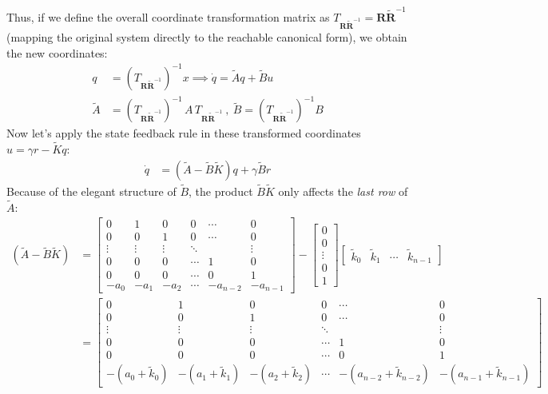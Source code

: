 \documentclass[twoside, 11pt, a4paper]{article}
\begin{document}
Thus, if we define the overall coordinate transformation matrix as $T_{\mathbf{R} \tilde{\mathbf{R}}^{-1}} = \mathbf{R} \tilde{\mathbf{R}}^{-1}$ (mapping the original system directly to the reachable canonical form), we obtain the new coordinates:
%
\begin{align*}
	q &= \left( T_{\mathbf{R} \tilde{\mathbf{R}}^{-1}} \right)^{-1} x \implies \dot{q} = \tilde{A} q + \tilde{B} u \\
	\tilde{A} &= \left( T_{\mathbf{R} \tilde{\mathbf{R}}^{-1}} \right)^{-1} \, A \, T_{\mathbf{R} \tilde{\mathbf{R}}^{-1}} \ , \ \tilde{B} = \left(  T_{\mathbf{R} \tilde{\mathbf{R}}^{-1}} \right)^{-1} B 
\end{align*}
%
Now let's apply the state feedback rule in these transformed coordinates $u = \gamma r - \tilde{K} q$:
%
\begin{align*}
 \dot{q} &= ( \tilde{A} - \tilde{B} \tilde{K} ) q + \gamma \tilde{B} r 
\end{align*}
Because of the elegant structure of $\tilde{B}$, the product $\tilde{B} \tilde{K}$ only affects the \textit{last row} of $\tilde{A}$:
\begin{align*}
 ( \tilde{A} - \tilde{B} \tilde{K} ) &= 
 \left[ \begin{array}{c|c|c|c|c|c} 
0 & 1 & 0 & 0 & \cdots & 0 \\
0 & 0 & 1 &  0 & \cdots & 0 \\
\vdots & \vdots & \vdots & \ddots &  & \vdots \\
0 & 0 & 0 & \cdots  & 1 & 0 \\
0 & 0 & 0 & \cdots  & 0 & 1 \\
-a_{0} & -a_{1} & -a_{2} & \cdots  & -a_{n-2} & -a_{n-1} 
\end{array} \right] - \begin{bmatrix} 0 \\ 0 \\ \vdots \\ 0 \\ 1 \end{bmatrix}
\begin{bmatrix} \tilde{k}_0 & \tilde{k}_1 & \cdots & \tilde{k}_{n-1} \end{bmatrix}
\\
&=  \left[ \begin{array}{c|c|c|c|c|c} 
0 & 1 & 0 & 0 & \cdots & 0 \\
0 & 0 & 1 &  0 & \cdots & 0 \\
\vdots & \vdots & \vdots & \ddots &  & \vdots \\
0 & 0 & 0 & \cdots  & 1 & 0 \\
0 & 0 & 0 & \cdots  & 0 & 1 \\
-(a_{0}+\tilde{k}_0) & -(a_{1}+\tilde{k}_1) & -(a_{2}+\tilde{k}_2) & \cdots  & -(a_{n-2}+\tilde{k}_{n-2}) & -(a_{n-1} + \tilde{k}_{n-1})
\end{array} \right]
\end{align*}
\end{document}
